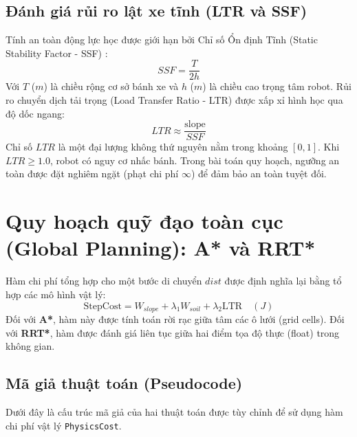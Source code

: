 \documentclass[12pt, a4paper]{article}
\begin{document}
\subsection{Đánh giá rủi ro lật xe tĩnh (LTR và SSF)}
Tính an toàn động lực học được giới hạn bởi Chỉ số Ổn định Tĩnh (Static Stability Factor - SSF) \cite{chen2012ltr}:
\begin{equation}
    SSF = \frac{T}{2h}
\end{equation}
Với $T$ ($m$) là chiều rộng cơ sở bánh xe và $h$ ($m$) là chiều cao trọng tâm robot. Rủi ro chuyển dịch tải trọng (Load Transfer Ratio - LTR) được xấp xỉ hình học qua độ dốc ngang:
\begin{equation}
    LTR \approx \frac{\text{slope}}{SSF}
\end{equation}
Chỉ số $LTR$ là một đại lượng không thứ nguyên nằm trong khoảng $[0, 1]$. Khi $LTR \geq 1.0$, robot có nguy cơ nhấc bánh. Trong bài toán quy hoạch, ngưỡng an toàn được đặt nghiêm ngặt (phạt chi phí $\infty$) để đảm bảo an toàn tuyệt đối.

\section{Quy hoạch quỹ đạo toàn cục (Global Planning): A* và RRT*}

Hàm chi phí tổng hợp cho một bước di chuyển $dist$ được định nghĩa lại bằng tổ hợp các mô hình vật lý:
\begin{equation}
    \text{StepCost} = W_{slope} + \lambda_1 W_{soil} + \lambda_2 \text{LTR} \quad (J)
\end{equation}
Đối với \textbf{A*}, hàm này được tính toán rời rạc giữa tâm các ô lưới (grid cells). Đối với \textbf{RRT*}, hàm được đánh giá liên tục giữa hai điểm tọa độ thực (float) trong không gian.

\subsection{Mã giả thuật toán (Pseudocode)}
Dưới đây là cấu trúc mã giả của hai thuật toán được tùy chỉnh để sử dụng hàm chi phí vật lý \texttt{PhysicsCost}.
\end{document}
